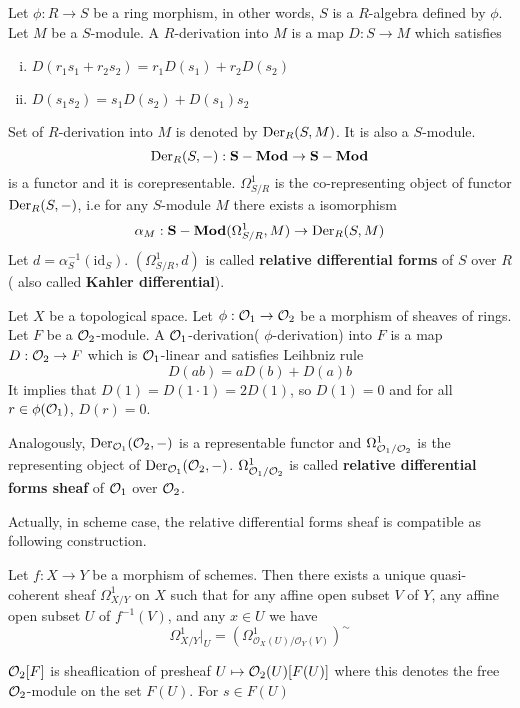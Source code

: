 \begin{mydefn}
Let $\phi: R \rightarrow S$ be a ring morphism, in other words, $S$ is a $R$-algebra defined by $\phi$. Let $M$ be a $S$-module. A $R$-derivation into $M$ is a map $D: S \rightarrow M$ which satisfies
\begin{enumerate}[(i)]
	\item $D(r_1 s_1 + r_2 s_2)=r_1 D(s_1) + r_2 D(s_2)$
	\item $D(s_1 s_2) = s_1 D(s_2) + D(s_1) s_2$
\end{enumerate}
\end{mydefn}
Set of $R$-derivation into $M$ is denoted by $\text{Der}_{R}(S,M)$. It is also a $S$-module.
\[
\text{Der}_{R}(S,-): \mathbf{S-Mod} \rightarrow \mathbf{S-Mod}
\]
 is a functor and it is corepresentable. $\Omega_{S/R}^1$ is the co-representing object of functor $\text{Der}_{R}(S,-)$, i.e for any $S$-module $M$ there exists a isomorphism
 \[
 \alpha_{M}: \mathbf{S-Mod}(\Omega_{S/R}^1,M) \rightarrow \text{Der}_{R}(S,M)
 \]
Let $d= \alpha_{S}^{-1}(\text{id}_{S})$. $(\Omega_{S/R}^1, d)$ is called \textbf{relative differential forms} of $S$ over $R$( also called \textbf{Kahler differential}).

\begin{mydefn}
Let $X$ be a topological space. Let $\phi: \mathcal{O}_{1} \rightarrow \mathcal{O}_{2}$ be a morphism of sheaves of rings. Let $F$ be a $\mathcal{O}_{2}$-module. A $\mathcal{O}_1$-derivation( $\phi$-derivation) into $F$ is a map $D: \mathcal{O}_2 \rightarrow F$ which is $\mathcal{O}_1$-linear and satisfies Leihbniz rule
\[
D(ab)=aD(b)+D(a)b
\]
It implies that $D(1)=D(1\cdot 1)=2D(1)$, so $D(1)=0$ and for all $r \in \phi(\mathcal{O}_1)$, $D(r)=0$.
\par
Analogously, $\text{Der}_{\mathcal{O}_1}(\mathcal{O}_2,-)$ is a representable functor and $\Omega_{\mathcal{O}_1/\mathcal{O}_2}^1$ is the representing object of $\text{Der}_{\mathcal{O}_1}(\mathcal{O}_2,-)$. $\Omega_{\mathcal{O}_1/\mathcal{O}_2}^1$ is called \textbf{relative differential forms sheaf} of $\mathcal{O}_1$ over $\mathcal{O}_2$.
\end{mydefn}
Actually, in scheme case, the relative differential forms sheaf is compatible as following construction.
\begin{prop}
Let $f: X \rightarrow Y$ be a morphism of schemes. Then there exists a unique quasi-coherent sheaf $\Omega_{X/Y}^1$ on $X$ such that for any affine open subset $V$ of $Y$, any affine open subset $U$ of $ f^{-1}(V)$, and any $x \in U$ we have
\[
\Omega_{X/Y}^{1}|_{U}= (\Omega^{1}_{\mathcal{O}_{X}(U)/\mathcal{O}_{Y}(V)})^{\sim}
\]
\end{prop}
$\mathcal{O}_{2}[F]$ is sheaflication of presheaf $U \mapsto \mathcal{O}_{2}(U)[F(U)]$ where this denotes the free $\mathcal{O}_{2}$-module on the set $F(U)$. For $s \in F(U)$
